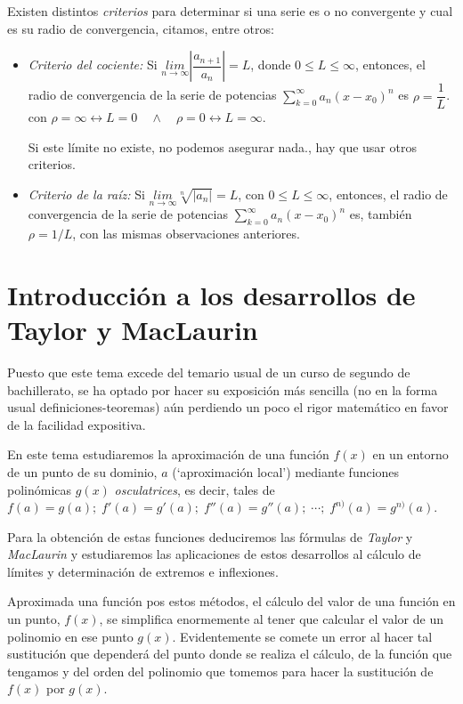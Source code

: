 Existen distintos \emph{criterios} para determinar si una serie es o no convergente y cual es su radio de convergencia, citamos, entre otros:
\begin{itemize}
	\item \emph{Criterio del cociente: } Si $\underset {n\to \infty}{lim}{\left| \dfrac {a_{n+1}}{a_n} \right|}=L$, donde $0\le L \le \infty$, entonces, el radio de convergencia de la serie de potencias $\sum _{ k=0 }^{ \infty }{a_n(x-x_0)^n}$ es $\rho=\dfrac 1 L$. con $\rho=\infty \leftrightarrow L=0 \quad \wedge \quad \rho=0 \leftrightarrow L=\infty$.
	
	Si este límite no existe, no podemos asegurar nada., hay que usar otros criterios.
	\item \emph{Criterio de la raíz: } Si $\underset{n\to \infty}{lim}{\sqrt[n]{|a_n|}}=L$,  con  $ 0\le L \le \infty$, entonces, el radio de convergencia de la serie de potencias $\sum _{ k=0 }^{ \infty }{a_n(x-x_0)^n}$ es, también  $\rho=1/L$, con las mismas observaciones anteriores.
\end{itemize} 

\section[Introducción a los desarrollos de Taylor y MacLaurin]{Introducción a los desarrollos de Taylor y MacLaurin }

Puesto que este tema excede del temario usual de un curso de segundo de bachillerato, se ha optado por hacer su exposición más sencilla (no en la forma usual definiciones-teoremas) aún perdiendo un poco el rigor matemático en favor de la facilidad expositiva.

En este tema estudiaremos la aproximación de una función $f(x)$ en un entorno de un punto de su dominio, $a$ (`aproximación local') mediante funciones polinómicas $g(x)$ \emph{osculatrices}, es decir, tales de $f(a)=g(a); \; f'(a)=g'(a); \; f''(a)=g''(a); \; \cdots  ; \; f^{n)}(a)=g^{n)}(a)$.

Para la obtención de estas funciones deduciremos las fórmulas de \emph{Taylor} y \emph{MacLaurin} y estudiaremos las aplicaciones de estos desarrollos al cálculo de límites y determinación de extremos e inflexiones.

Aproximada una función pos estos métodos, el cálculo del valor de una función en un punto, $f(x)$, se simplifica enormemente al tener que calcular el valor de un polinomio en ese punto $g(x)$. Evidentemente se comete un error al hacer tal sustitución que dependerá del punto donde se realiza el cálculo, de la función que tengamos y del orden del polinomio que tomemos para hacer la sustitución de $f(x)$ por $g(x)$.


